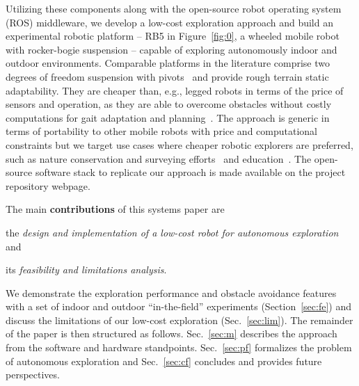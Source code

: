 \documentclass[letterpaper,10pt,conference,twoside]{IEEEtran}
\makeatletter
\theoremstyle{definition}
\newcommand\footnoteref[1]{\protected@xdef\@thefnmark{\ref{#1}}\@footnotemark}
\makeatother
\begin{document}
Utilizing these components along with the open-source robot operating system (ROS) middleware, we develop 
a low-cost %
exploration approach %
and build an experimental robotic platform -- RB5 in Figure~\ref{fig:0}, a wheeled mobile robot with rocker-bogie suspension -- capable of exploring autonomously indoor and outdoor environments. 
Comparable platforms in the literature comprise two degrees of freedom suspension with pivots~\cite{setterfield2013terrain,%
faisal2021low} and provide rough terrain static adaptability. %
They are cheaper than, e.g., legged robots in terms of the price of sensors %
and operation, as they are able to overcome obstacles without costly computations for gait adaptation and planning~\cite{muller2021openbot}.
The approach is generic in terms of portability to other mobile robots with price and computational constraints but we target use cases where cheaper robotic explorers are preferred, such as nature conservation and surveying efforts~\cite{kirchgeorg2022multimodal} and education~\cite{betz2022autonomous,amster2020turtlebot}. %
The open-source software stack to replicate our approach is made available on the project repository webpage\footnoteref{link}.

The main \textbf{contributions} of this systems paper are 
\begin{enumerate*}[label={(\roman*)},font={\textit}]
  \item the \textit{design and implementation of a low-cost robot for autonomous exploration} and 
  \item its \textit{feasibility and limitations analysis}. %
\end{enumerate*}
We demonstrate the exploration performance and obstacle avoidance features %
with a set of indoor and outdoor ``in-the-field'' experiments (Section~\ref{sec:fe}) and discuss the limitations of our low-cost exploration (Sec.~\ref{sec:lim}). The remainder of the paper is then structured as follows. Sec.~\ref{sec:m} describes the approach from the software and hardware standpoints. Sec.~\ref{sec:pf} formalizes the problem of autonomous exploration and Sec.~\ref{sec:cf} concludes and provides future perspectives.
\end{document}
